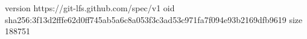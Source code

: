 version https://git-lfs.github.com/spec/v1
oid sha256:3f13d2fffe62d0ff745ab5a6c8a053f3c3ad53c971fa7f094e93b2169dfb9619
size 188751

